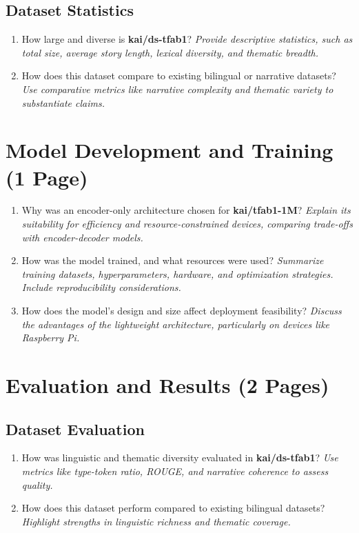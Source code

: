 \documentclass[11pt]{article}
\begin{document}
\subsection{Dataset Statistics}
\begin{enumerate}
    \item How large and diverse is \textbf{kai/ds-tfab1}?  
    \textit{Provide descriptive statistics, such as total size, average story length, lexical diversity, and thematic breadth.}

    \item How does this dataset compare to existing bilingual or narrative datasets?  
    \textit{Use comparative metrics like narrative complexity and thematic variety to substantiate claims.}
\end{enumerate}

\section{Model Development and Training (1 Page)}
\begin{enumerate}
    \item Why was an encoder-only architecture chosen for \textbf{kai/tfab1-1M}?  
    \textit{Explain its suitability for efficiency and resource-constrained devices, comparing trade-offs with encoder-decoder models.}

    \item How was the model trained, and what resources were used?  
    \textit{Summarize training datasets, hyperparameters, hardware, and optimization strategies. Include reproducibility considerations.}

    \item How does the model’s design and size affect deployment feasibility?  
    \textit{Discuss the advantages of the lightweight architecture, particularly on devices like Raspberry Pi.}
\end{enumerate}

\section{Evaluation and Results (2 Pages)}
\subsection{Dataset Evaluation}
\begin{enumerate}
    \item How was linguistic and thematic diversity evaluated in \textbf{kai/ds-tfab1}?  
    \textit{Use metrics like type-token ratio, ROUGE, and narrative coherence to assess quality.}

    \item How does this dataset perform compared to existing bilingual datasets?  
    \textit{Highlight strengths in linguistic richness and thematic coverage.}
\end{enumerate}
\end{document}
